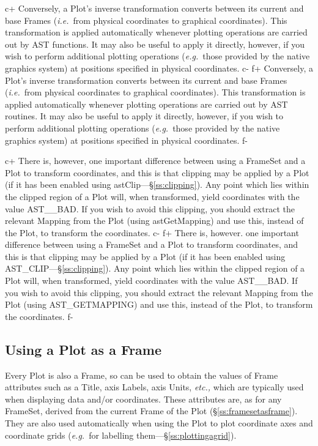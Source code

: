\documentclass[twoside,11pt]{article}
\newcommand{\secref}[1]{\S\ref{#1}}
\newcommand{\secref}[1]{\ref{#1}}
\begin{document}
c+
Conversely, a Plot's inverse transformation converts between its
current and base Frames ({\em{i.e.}}\ from physical coordinates to
graphical coordinates). This transformation is applied automatically
whenever plotting operations are carried out by AST functions. It may
also be useful to apply it directly, however, if you wish to perform
additional plotting operations ({\em{e.g.}}\ those provided by the
native graphics system) at positions specified in physical
coordinates.
c-
f+
Conversely, a Plot's inverse transformation converts between its
current and base Frames ({\em{i.e.}}\ from physical coordinates to
graphical coordinates). This transformation is applied automatically
whenever plotting operations are carried out by AST routines. It may
also be useful to apply it directly, however, if you wish to perform
additional plotting operations ({\em{e.g.}}\ those provided by the
native graphics system) at positions specified in physical
coordinates.
f-

c+
There is, however, one important difference between using a FrameSet
and a Plot to transform coordinates, and this is that clipping may be
applied by a Plot (if it has been enabled using
astClip---\secref{ss:clipping}). Any point which lies within the
clipped region of a Plot will, when transformed, yield coordinates
with the value AST\_\_BAD. If you wish to avoid this clipping, you
should extract the relevant Mapping from the Plot (using
astGetMapping) and use this, instead of the Plot, to transform the
coordinates.
c-
f+
There is, however. one important difference between using a FrameSet
and a Plot to transform coordinates, and this is that clipping may be
applied by a Plot (if it has been enabled using
AST\_CLIP---\secref{ss:clipping}). Any point which lies within the
clipped region of a Plot will, when transformed, yield coordinates
with the value AST\_\_BAD. If you wish to avoid this clipping, you
should extract the relevant Mapping from the Plot (using
AST\_GETMAPPING) and use this, instead of the Plot, to transform the
coordinates.
f-

\subsection{Using a Plot as a Frame}

Every Plot is also a Frame, so can be used to obtain the values of
Frame attributes such as a Title, axis Labels, axis Units,
{\em{etc.,}} which are typically used when displaying data and/or
coordinates. These attributes are, as for any FrameSet, derived from
the current Frame of the Plot (\secref{ss:framesetasframe}). They are
also used automatically when using the Plot to plot coordinate axes
and coordinate grids ({\em{e.g.}}\ for labelling
them---\secref{ss:plottingagrid}).
\end{document}
